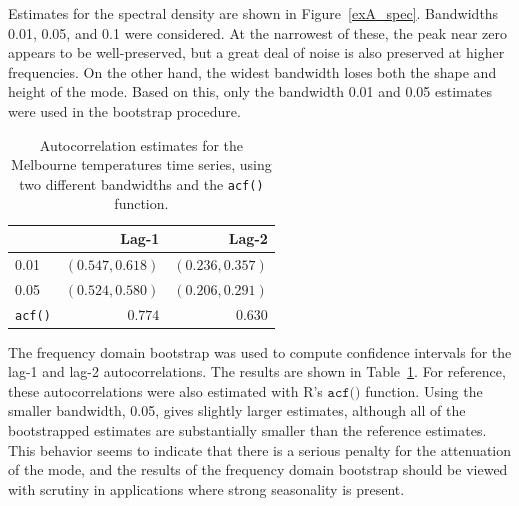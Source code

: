 Estimates for the spectral density are shown in Figure~\ref{exA_spec}.
Bandwidths 0.01, 0.05, and 0.1 were considered.
At the narrowest of these, the peak near zero appears to be well-preserved,
but a great deal of noise is also preserved at higher frequencies.
On the other hand, the widest bandwidth loses both the shape and height of the
mode. Based on this, only the bandwidth 0.01 and 0.05 estimates were used in
the bootstrap procedure.

    \begin{table}[h]
    \centering
    \begin{tabular}{lrr}
    \toprule
    & Lag-1 & Lag-2 \\
    \midrule
    0.01 & $(0.547, 0.618)$ & $(0.236, 0.357)$ \\
    0.05 & $(0.524, 0.580)$ & $(0.206, 0.291)$ \\
    \texttt{acf()} & $0.774$ & $0.630$ \\
    \bottomrule
    \end{tabular}
    \caption{
        Autocorrelation estimates for the Melbourne temperatures time series,
        using two different bandwidths and the \texttt{acf()} function.}
    \label{exA_est}
    \end{table}

The frequency domain bootstrap was used to compute confidence intervals for the
lag-1 and lag-2 autocorrelations.
The results are shown in Table~\ref{exA_est}.
For reference, these autocorrelations were also estimated with R's
$\texttt{acf()}$ function.
Using the smaller bandwidth, 0.05, gives slightly larger estimates,
although all of the bootstrapped estimates are substantially smaller than the
reference estimates.
This behavior seems to indicate that there is a serious penalty for the
attenuation of the mode,
and the results of the frequency domain bootstrap should be viewed with
scrutiny in applications where strong seasonality is present.

